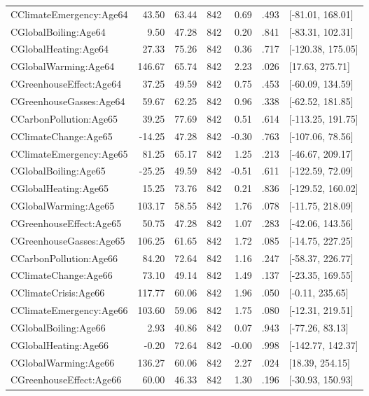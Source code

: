 \begin{table}[ht]
\begin{tabular}{lrrrrrl}
  CClimateEmergency:Age64 & 43.50 & 63.44 & 842 & 0.69 & .493 & [-81.01, 168.01] \\ 
  CGlobalBoiling:Age64 & 9.50 & 47.28 & 842 & 0.20 & .841 & [-83.31, 102.31] \\ 
  CGlobalHeating:Age64 & 27.33 & 75.26 & 842 & 0.36 & .717 & [-120.38, 175.05] \\ 
  CGlobalWarming:Age64 & 146.67 & 65.74 & 842 & 2.23 & .026 & [17.63, 275.71] \\ 
  CGreenhouseEffect:Age64 & 37.25 & 49.59 & 842 & 0.75 & .453 & [-60.09, 134.59] \\ 
  CGreenhouseGasses:Age64 & 59.67 & 62.25 & 842 & 0.96 & .338 & [-62.52, 181.85] \\ 
  CCarbonPollution:Age65 & 39.25 & 77.69 & 842 & 0.51 & .614 & [-113.25, 191.75] \\ 
  CClimateChange:Age65 & -14.25 & 47.28 & 842 & -0.30 & .763 & [-107.06, 78.56] \\ 
  CClimateEmergency:Age65 & 81.25 & 65.17 & 842 & 1.25 & .213 & [-46.67, 209.17] \\ 
  CGlobalBoiling:Age65 & -25.25 & 49.59 & 842 & -0.51 & .611 & [-122.59, 72.09] \\ 
  CGlobalHeating:Age65 & 15.25 & 73.76 & 842 & 0.21 & .836 & [-129.52, 160.02] \\ 
  CGlobalWarming:Age65 & 103.17 & 58.55 & 842 & 1.76 & .078 & [-11.75, 218.09] \\ 
  CGreenhouseEffect:Age65 & 50.75 & 47.28 & 842 & 1.07 & .283 & [-42.06, 143.56] \\ 
  CGreenhouseGasses:Age65 & 106.25 & 61.65 & 842 & 1.72 & .085 & [-14.75, 227.25] \\ 
  CCarbonPollution:Age66 & 84.20 & 72.64 & 842 & 1.16 & .247 & [-58.37, 226.77] \\ 
  CClimateChange:Age66 & 73.10 & 49.14 & 842 & 1.49 & .137 & [-23.35, 169.55] \\ 
  CClimateCrisis:Age66 & 117.77 & 60.06 & 842 & 1.96 & .050 & [-0.11, 235.65] \\ 
  CClimateEmergency:Age66 & 103.60 & 59.06 & 842 & 1.75 & .080 & [-12.31, 219.51] \\ 
  CGlobalBoiling:Age66 & 2.93 & 40.86 & 842 & 0.07 & .943 & [-77.26, 83.13] \\ 
  CGlobalHeating:Age66 & -0.20 & 72.64 & 842 & -0.00 & .998 & [-142.77, 142.37] \\ 
  CGlobalWarming:Age66 & 136.27 & 60.06 & 842 & 2.27 & .024 & [18.39, 254.15] \\ 
  CGreenhouseEffect:Age66 & 60.00 & 46.33 & 842 & 1.30 & .196 & [-30.93, 150.93] \\ 

\end{tabular}
\end{table}
